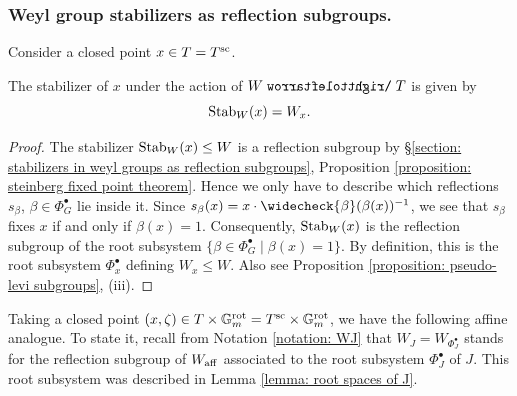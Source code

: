 \subsubsection{Weyl group stabilizers as reflection subgroups.}
Consider a closed point $x \in T=T^{\sc}$.
\begin{lemma}\label{lemma: stabilizer in finite weyl group}
The stabilizer of $x$ under the action of $W \acts T$ is given by
\begin{equation*}
    \Stab_W(x) = W_x.
\end{equation*}   
\end{lemma}
\begin{proof}
The stabilizer $\Stab_W(x) \leq W$ is a reflection subgroup by \S \ref{section: stabilizers in weyl groups as reflection subgroups}, Proposition \ref{proposition: steinberg fixed point theorem}.
Hence we only have to describe which reflections $s_{\beta}$, $\beta \in \Phi^{\bullet}_G$ lie inside it. Since $s_{\beta}(x) = x \cdot \widecheck{\beta}(\beta(x))^{-1}$, we see that $s_{\beta}$ fixes $x$ if and only if $\beta(x)=1$. Consequently, $\Stab_W(x)$ is the reflection subgroup of the root subsystem $\{ \beta \in \Phi^{\bullet}_G \mid \beta(x)=1 \}$. By definition, this is the root subsystem $\Phi^{\bullet}_x$ defining $W_x \leq W$. Also see Proposition \ref{proposition: pseudo-levi subgroups}, (iii).
\end{proof}

Taking a closed point $(x, \zeta) \in T \times \Gm^{\rot} = T^{\sc} \times \Gm^{\rot}$, we have the following affine analogue. To state it, recall from Notation \ref{notation: WJ} that $W_J = W_{\Phi^{\bullet}_J}$ stands for the reflection subgroup of $W_{\aff}$ associated to the root subsystem $\Phi^{\bullet}_J$ of $J$. This root subsystem was described in Lemma \ref{lemma: root spaces of J}.

